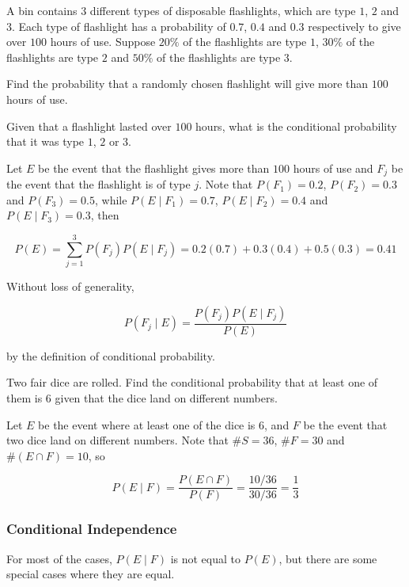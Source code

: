 \documentclass[a4paper,12pt]{article}
\begin{document}
\begin{exm}
  A bin contains $3$ different types of disposable flashlights, which are type $1$, $2$ and $3$. Each type of flashlight has a probability of $0.7$, $0.4$ and $0.3$ respectively to give over $100$ hours of use. Suppose $20\%$ of the flashlights are type $1$, $30\%$ of the flashlights are type $2$ and $50\%$ of the flashlights are type $3$.

  \begin{alist}
    \item Find the probability that a randomly chosen flashlight will give more than $100$ hours of use.
    \item Given that a flashlight lasted over $100$ hours, what is the conditional probability that it was type $1$, $2$ or $3$.
  \end{alist}

  \ans{} Let $E$ be the event that the flashlight gives more than $100$ hours of use and $F_{j}$ be the event that the flashlight is of type $j$. Note that $P(F_{1})=0.2$, $P(F_{2})=0.3$ and $P(F_{3})=0.5$, while $P(E\mid F_{1})=0.7$, $P(E\mid F_{2})=0.4$ and $P(E\mid F_{3})=0.3$, then

  $$P(E)=\sum_{j=1}^{3}P(F_{j})P(E\mid F_{j})=0.2(0.7)+0.3(0.4)+0.5(0.3)=0.41$$\s

   Without loss of generality,

  $$P(F_{j}\mid E)=\frac{P(F_{j})P(E\mid F_{j})}{P(E)}$$\s

  by the definition of conditional probability.
\end{exm}\n

\begin{exm}
  Two fair dice are rolled. Find the conditional probability that at least one of them is $6$ given that the dice land on different numbers.\n

  \ans Let $E$ be the event where at least one of the dice is $6$, and $F$ be the event that two dice land on different numbers. Note that $\#S=36$, $\#F=30$ and $\#(E\cap F)=10$, so

  $$P(E\mid F)=\frac{P(E\cap F)}{P(F)}=\frac{10/36}{30/36}=\frac{1}{3}$$
\end{exm}\n

\subsubsection{Conditional Independence}
For most of the cases, $P(E\mid F)$ is not equal to $P(E)$, but there are some special cases where they are equal.\n
\end{document}
